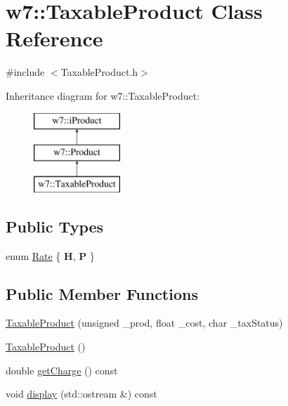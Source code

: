 \hypertarget{classw7_1_1TaxableProduct}{}\section{w7\+:\+:Taxable\+Product Class Reference}
\label{classw7_1_1TaxableProduct}


{\ttfamily \#include $<$Taxable\+Product.\+h$>$}

Inheritance diagram for w7\+:\+:Taxable\+Product\+:\begin{figure}[H]
\begin{center}
\leavevmode
\includegraphics[height=3.000000cm]{classw7_1_1TaxableProduct}
\end{center}
\end{figure}
\subsection*{Public Types}
\begin{DoxyCompactItemize}
\item 
enum \mbox{\hyperlink{classw7_1_1TaxableProduct_a4685ed7e7a83db12a00c004b438e37eb}{Rate}} \{ {\bfseries H}, 
{\bfseries P}
 \}
\end{DoxyCompactItemize}
\subsection*{Public Member Functions}
\begin{DoxyCompactItemize}
\item 
\mbox{\hyperlink{classw7_1_1TaxableProduct_a2e4fb43aefb12ca0778fc4f0a6ffb987}{Taxable\+Product}} (unsigned \+\_\+prod, float \+\_\+cost, char \+\_\+tax\+Status)
\item 
\mbox{\hyperlink{classw7_1_1TaxableProduct_ab9ee3a59e2483d33652ef4103f807e9a}{Taxable\+Product}} ()
\item 
double \mbox{\hyperlink{classw7_1_1TaxableProduct_a3f41864e2a88fa6d847b7fcb704f41f9}{get\+Charge}} () const
\item 
void \mbox{\hyperlink{classw7_1_1TaxableProduct_a57f8cd41d82054c77a7f7f1cf204cc7d}{display}} (std\+::ostream \&) const
\end{DoxyCompactItemize}


